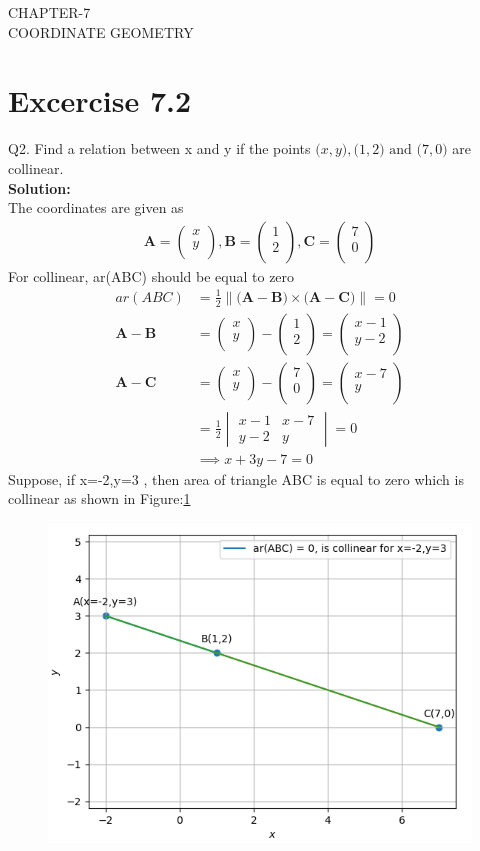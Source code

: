 \documentclass[12pt]{article}
\newcommand{\mydet}[1]{\ensuremath{\begin{vmatrix}#1\end{vmatrix}}}
\providecommand{\norm}[1]{\left\lVert#1\right\rVert}
\newcommand{\solution}{\noindent \textbf{Solution: }}
\newcommand{\myvec}[1]{\ensuremath{\begin{pmatrix}#1\end{pmatrix}}}
\let\vec\mathbf
\begin{document}
\begin{center}
\textbf\large{CHAPTER-7 \\ COORDINATE GEOMETRY}
\end{center}
\section*{Excercise 7.2}

Q2. Find a relation between x and y if the points $\vec(x, y), \vec(1, 2) \text{ and } \vec(7, 0)$ are collinear.
\\
\solution
\\
The coordinates are given as
	\begin{align}
	\vec{A} = \myvec{
		x\\
		y\\
		},
	\vec{B} = \myvec{
		1\\
		2\\
		},
	\vec{C} = \myvec{
		7\\
		0\\
		}
	\end{align}
For collinear, ar(ABC) should be equal to zero
	\begin{align}
		ar(ABC)&=\frac{1}{2}{\norm{\vec(\vec{A}-\vec{B})\times\vec(\vec{A}-\vec{C})}}=0\\
		\vec{A}-\vec{B} &=  \myvec{
  x \\
  y \\
 } - \myvec{
  1 \\
  2 \\
 } = \myvec{
 x-1 \\
 y-2 \\
 }
 \\
		\vec{A}-\vec{C} &=  \myvec{
  x \\
  y \\
 } - \myvec{
  7 \\
  0 \\
 } = \myvec{
 x-7 \\
 y \\
 }
 \\
		&=\frac{1}{2}\mydet{x-1 & x-7\\y-2 & y}=0\\
		&\implies x+3y-7=0
	\end{align}
	Suppose, if x=-2,y=3 , then area of triangle ABC is equal to zero which is collinear as shown in Figure:\ref{fig:Fig}
\begin{figure}[!h]
	\begin{center} 
	    \includegraphics[width=\columnwidth]{./figs/sc1.png}
	\end{center}
\caption{}
\label{fig:Fig}
\end{figure}
\end{document}
